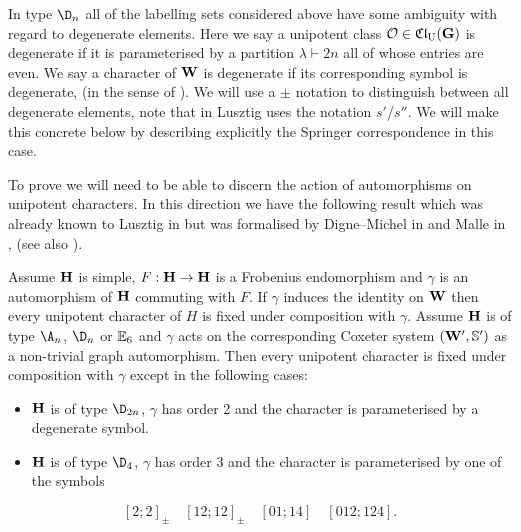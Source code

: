 \documentclass[eqthmnum]{jt-calcs}
\newcommand{\Clu}{\ensuremath{\mathfrak{Cl}_{\mathrm{U}}}}
\renewcommand{\cref}{\Cref}
\begin{document}
\begin{pa}
In type $\D_n$ all of the labelling sets considered above have some ambiguity with regard to degenerate elements. Here we say a unipotent class $\mathcal{O} \in \Clu(\bG)$ is degenerate if it is parameterised by a partition $\lambda \vdash 2n$ all of whose entries are even. We say a character of $\mathbf{W}$ is degenerate if its corresponding symbol is degenerate, (in the sense of \cite[\S4.6]{lusztig:1984:characters-of-reductive-groups}). We will use a $\pm$ notation to distinguish between all degenerate elements, note that in \cite[Chapter 4]{lusztig:1984:characters-of-reductive-groups} Lusztig uses the notation $s'$/$s''$. We will make this concrete below by describing explicitly the Springer correspondence in this case.
\end{pa}

\begin{pa}
To prove \cref{prop:A} we will need to be able to discern the action of automorphisms on unipotent characters. In this direction we have the following result which was already known to Lusztig in \cite{lusztig:1988:reductive-groups-with-a-disconnected-centre} but was formalised by Digne--Michel in \cite[Proposition 6.6]{digne-michel:1990:lusztigs-parametrization} and Malle in \cite[\S1]{malle:1991:darstellungstheorie-galoisgruppen}, (see also \cite[Proposition 3.7]{malle:2007:height-0-characters}).
\end{pa}

\begin{lem}\label{lem:invariance-unipotent}
Assume $\mathbf{H}$ is simple, $F : \mathbf{H} \to \mathbf{H}$ is a Frobenius endomorphism and $\gamma$ is an automorphism of $\mathbf{H}$ commuting with $F$. If $\gamma$ induces the identity on $\mathbf{W}$ then every unipotent character of $H$ is fixed under composition with $\gamma$. Assume $\mathbf{H}$ is of type $\A_n$, $\D_n$ or ${\mathbb E}_6$ and $\gamma$ acts on the corresponding Coxeter system $(\mathbf{W}',\mathbb{S}')$ as a non-trivial graph automorphism. Then every unipotent character is fixed under composition with $\gamma$ except in the following cases:
\begin{itemize}
	\item $\mathbf{H}$ is of type $\D_{2n}$, $\gamma$ has order 2 and the character is parameterised by a degenerate symbol.
	\item $\mathbf{H}$ is of type $\D_4$, $\gamma$ has order 3 and the character is parameterised by one of the symbols
\end{itemize}
\begin{equation}\label{eq:stable-chars-D4}
[2;2]_{\pm}
\quad
[12;12]_{\pm}
\quad
[01;14]
\quad
[012;124].
\end{equation}
\end{lem}
\end{document}
